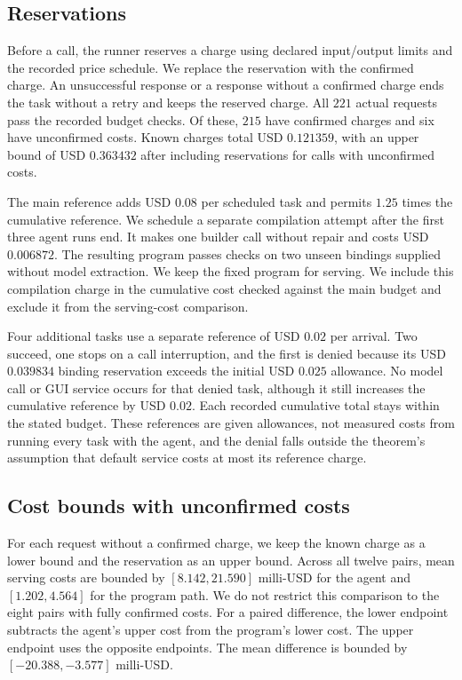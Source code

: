 \subsection{Reservations}
Before a call, the runner reserves a charge using declared input/output limits and the recorded price schedule.
We replace the reservation with the confirmed charge.
An unsuccessful response or a response without a confirmed charge ends the task without a retry and keeps the reserved charge.
All $221$ actual requests pass the recorded budget checks.
Of these, $215$ have confirmed charges and six have unconfirmed costs.
Known charges total USD $0.121359$, with an upper bound of USD $0.363432$ after including reservations for calls with unconfirmed costs.

The main reference adds USD $0.08$ per scheduled task and permits $1.25$ times the cumulative reference.
We schedule a separate compilation attempt after the first three agent runs end.
It makes one builder call without repair and costs USD $0.006872$.
The resulting program passes checks on two unseen bindings supplied without model extraction.
We keep the fixed program for serving.
We include this compilation charge in the cumulative cost checked against the main budget and exclude it from the serving-cost comparison.

Four additional tasks use a separate reference of USD $0.02$ per arrival.
Two succeed, one stops on a call interruption, and the first is denied because its USD $0.039834$ binding reservation exceeds the initial USD $0.025$ allowance.
No model call or GUI service occurs for that denied task, although it still increases the cumulative reference by USD $0.02$.
Each recorded cumulative total stays within the stated budget.
These references are given allowances, not measured costs from running every task with the agent, and the denial falls outside the theorem's assumption that default service costs at most its reference charge.

\subsection{Cost bounds with unconfirmed costs}
For each request without a confirmed charge, we keep the known charge as a lower bound and the reservation as an upper bound.
Across all twelve pairs, mean serving costs are bounded by $[8.142,21.590]$ milli-USD for the agent and $[1.202,4.564]$ for the program path.
We do not restrict this comparison to the eight pairs with fully confirmed costs.
For a paired difference, the lower endpoint subtracts the agent's upper cost from the program's lower cost.
The upper endpoint uses the opposite endpoints.
The mean difference is bounded by $[-20.388,-3.577]$ milli-USD.

